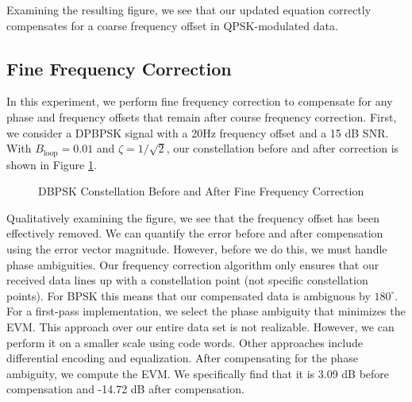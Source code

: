 \documentclass{article}
\begin{document}
\noindent Examining the resulting figure, we see that our updated equation correctly compensates for a coarse frequency offset in QPSK-modulated data.

\subsection{Fine Frequency Correction}

In this experiment, we perform fine frequency correction to compensate for any phase and frequency offsets that remain after course frequency correction. First, we consider a DPBPSK signal with a 20Hz frequency offset and a 15 dB SNR. With $B_\text{loop} = 0.01$ and $\zeta = 1/\sqrt{2}$, our constellation before and after correction is shown in Figure \ref{fig::fine_freq_comp_bpsk_const}.

\begin{figure}[H]
	\centerline{}
	\caption{DBPSK Constellation Before and After Fine Frequency Correction}
	\label{fig::fine_freq_comp_bpsk_const}
\end{figure}

\noindent Qualitatively examining the figure, we see that the frequency offset has been effectively removed. We can quantify the error before and after compensation using the error vector magnitude. However, before we do this, we must handle phase ambiguities. Our frequency correction algorithm only ensures that our received data lines up with a constellation point (not specific constellation points). For BPSK this means that our compensated data is ambiguous by $180^{\circ}$. For a first-pass implementation, we select the phase ambiguity that minimizes the EVM. This approach over our entire data set is not realizable. However, we can perform it on a smaller scale using code words. Other approaches include differential encoding and equalization. After compensating for the phase ambiguity, we compute the EVM. We specifically find that it is 3.09 dB before compensation and -14.72 dB after compensation.
\end{document}

